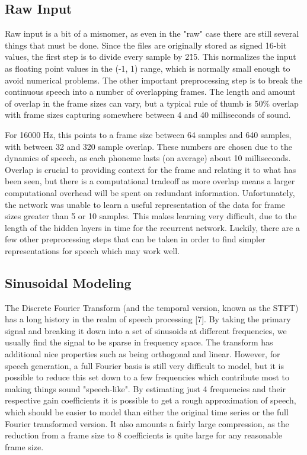 \documentclass{article} %
\begin{document}
\subsection{Raw Input}
Raw input is a bit of a misnomer, as even in the "raw" case there are still
several things that must be done. Since the files are originally stored
as signed 16-bit values, the first step is to divide every sample by 2\^15.
This normalizes the input as floating point values in the (-1, 1) range, which
is normally small enough to avoid numerical problems. The other important
preprocessing step is to break the continuous speech into a number of
overlapping frames. The length and amount of overlap in the frame sizes can
vary, but a typical rule of thumb is 50\% overlap with frame sizes
capturing somewhere between 4 and 40 milliseconds of sound.
\par
For 16000 Hz,
this points to a frame size between 64 samples and 640 samples, with between
32 and 320 sample overlap. These numbers are chosen due to the dynamics of
speech, as each phoneme lasts (on average) about 10 milliseconds. Overlap is
crucial to providing context for the frame and relating it to what has been
seen, but there is a computational tradeoff as more overlap means
a larger computational overhead will be spent on redundant information.
Unfortunately, the network was unable to learn a useful representation of the
data for frame sizes greater than 5 or 10 samples. This makes learning very
difficult, due to the length of the hidden layers in time for the recurrent
network. Luckily, there are a few other preprocessing steps that can be taken
in order to find simpler representations for speech which may work well.

\subsection{Sinusoidal Modeling}
The Discrete Fourier Transform (and the temporal version, known as the STFT)
has a long history in the realm of speech
processing [7]. By taking the primary signal and breaking it down into a set of
sinusoids at different frequencies, we usually find the signal to be sparse in
frequency space. The transform has 
additional nice properties such as being orthogonal and linear. However, for
speech generation, a full Fourier basis is still very difficult to model, but it
is possible to reduce this set down to a few frequencies which contribute
most to making things sound
"speech-like". By estimating just 4 frequencies and their respective
gain coefficients it is possible to get a rough approximation of speech,
which should be easier to model than either the original time series or the
full Fourier transformed version. It also amounts a fairly large compression,
as the reduction from a frame size to 8 coefficients is quite large for any
reasonable frame size.
\end{document}
